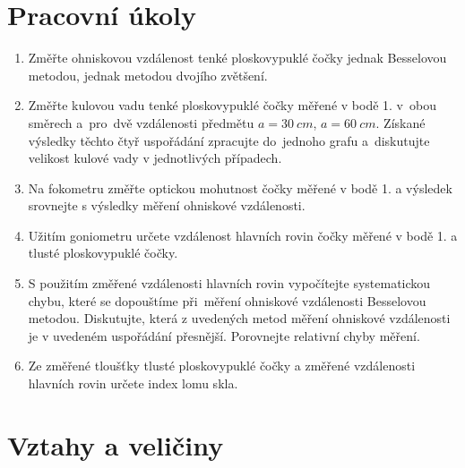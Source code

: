 \documentclass{../concepts/titul_zprava_p/prepareprotokolZprava} %
\begin{document}
\renewcommand{\figurename}{Graf}
\renewcommand{\refname}{Literatura}
\renewcommand{\today}{\number\day.\,\number\month.\,\number\year}

\graphicspath{{../concepts/titul_protokol_p/}}
\maketitle

\section{Pracovní úkoly}
\begin{enumerate}
    \item Změřte ohniskovou vzdálenost tenké ploskovypuklé čočky jednak Besselovou metodou, jednak metodou dvojího zvětšení.
    \item Změřte kulovou vadu tenké ploskovypuklé čočky měřené v bodě 1. v~obou směrech a~pro~dvě vzdálenosti předmětu 
    $a = \qty{30}{cm}$, $a = \qty{60}{cm}$. Získané výsledky těchto čtyř uspořádání zpracujte do~jednoho grafu a~diskutujte 
    velikost kulové vady v jednotlivých případech.
    \item Na fokometru změřte optickou mohutnost čočky měřené v bodě 1. a výsledek srovnejte s výsledky měření ohniskové vzdálenosti.
    \item Užitím goniometru určete vzdálenost hlavních rovin čočky měřené v bodě 1. a tlusté ploskovypuklé čočky.
    \item S použitím změřené vzdálenosti hlavních rovin vypočítejte systematickou chybu, které se dopouštíme při~měření ohniskové 
    vzdálenosti Besselovou metodou. Diskutujte, která z uvedených metod měření ohniskové vzdálenosti je v uvedeném uspořádání 
    přesnější. Porovnejte relativní chyby měření.
    \item Ze změřené tloušťky tlusté ploskovypuklé čočky a změřené vzdálenosti hlavních rovin určete index lomu skla.
\end{enumerate}


\section{Vztahy a veličiny}
\end{document}
